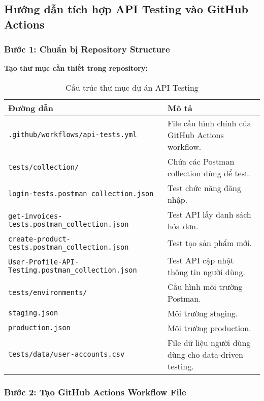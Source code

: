 \documentclass[12pt,a4paper]{article}
\begin{document}
  \subsection{Hướng dẫn tích hợp API Testing vào GitHub Actions}

  \subsubsection{Bước 1: Chuẩn bị Repository Structure}

  \textbf{Tạo thư mục cần thiết trong repository:}
\begin{table}[H]
\centering
\begin{tabularx}{\textwidth}{|l|X|}
\hline
\textbf{Đường dẫn} & \textbf{Mô tả} \\
\hline
\texttt{.github/workflows/api-tests.yml} & File cấu hình chính của GitHub Actions workflow. \\
\texttt{tests/collection/} & Chứa các Postman collection dùng để test. \\
\quad \texttt{login-tests.postman\_collection.json} & Test chức năng đăng nhập. \\
\quad \texttt{get-invoices-tests.postman\_collection.json} & Test API lấy danh sách hóa đơn. \\
\quad \texttt{create-product-tests.postman\_collection.json} & Test tạo sản phẩm mới. \\
\quad \texttt{User-Profile-API-Testing.postman\_collection.json} & Test API cập nhật thông tin người dùng. \\
\texttt{tests/environments/} & Cấu hình môi trường Postman. \\
\quad \texttt{staging.json} & Môi trường staging. \\
\quad \texttt{production.json} & Môi trường production. \\
\texttt{tests/data/user-accounts.csv} & File dữ liệu người dùng dùng cho data-driven testing. \\
\hline
\end{tabularx}
\caption{Cấu trúc thư mục dự án API Testing}
\end{table}


  \subsubsection{Bước 2: Tạo GitHub Actions Workflow File}
\end{document}
